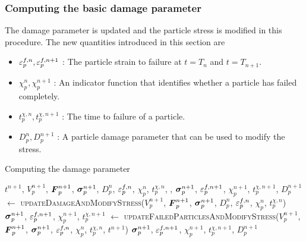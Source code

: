 \subsubsection{Computing the basic damage parameter}
The damage parameter is updated and the particle stress is modified in this procedure. The new 
quantities introduced in this section are
\begin{itemize} 
  \setlength\itemsep{1pt}
  \item $\varepsilon_p^{f,n}, \varepsilon_p^{f,n+1}$ : {\Ochre The particle strain to failure at $t = T_n$ 
        and $t = T_{n+1}$.}
  \item $\chi_p^{n}, \chi_p^{n+1}$ : {\Ochre An indicator function that identifies whether a particle
        has failed completely.} 
  \item $t_p^{\chi,n}, t_p^{\chi,n+1}$ : {\Ochre The time to failure of a particle.}
  \item $D_p^{n}, D_p^{n+1}$ : {\Ochre A particle damage parameter that can be used to modify the stress.}
\end{itemize}
\begin{breakablealgorithm}
  \caption{Computing the damage parameter}
  \begin{algorithmic}[1]
    \Require $t^{n+1}$, $V_p^{n+1}$, $\boldsymbol{F}_p^{n+1}$, $\boldsymbol{\sigma}_p^{n+1}$, $D_p^n$, $\varepsilon_p^{f,n}$, $\chi^n_p$, 
             $t^{\chi,n}_p$,
             , 
            \State $\boldsymbol{\sigma}_p^{n+1}$, $\varepsilon_p^{f,n+1}$, $\chi^{n+1}_p$, $t^{\chi,n+1}_p$, $D_p^{n+1}$ $\leftarrow$
               \textsc{updateDamageAndModifyStress}($V_p^{n+1}$, $\boldsymbol{F}_p^{n+1}$, \WWRP 
                  $\boldsymbol{\sigma}_p^{n+1}$, $D_p^n$, $\varepsilon_p^{f,n}$, $\chi^n_p$, $t^{\chi,n}_p$)
          \Else
            \State $\boldsymbol{\sigma}_p^{n+1}$, $\varepsilon_p^{f,n+1}$, $\chi^{n+1}_p$, $t^{\chi,n+1}_p$ $\leftarrow$
               \textsc{updateFailedParticlesAndModifyStress}($V_p^{n+1}$, $\boldsymbol{F}_p^{n+1}$, \WWRP 
                  $\boldsymbol{\sigma}_p^{n+1}$, $\varepsilon_p^{f,n}$, $\chi^n_p$, $t^{\chi,n}_p$, $t^{n+1}$)
          \EndIf
        \EndFor
      \EndFor
      \State \Return $\boldsymbol{\sigma}_p^{n+1}$, $\varepsilon_p^{f,n+1}$, $\chi^{n+1}_p$, $t^{\chi,n+1}_p$, $D_p^{n+1}$
    \EndProcedure
  \end{algorithmic}
\end{breakablealgorithm}

